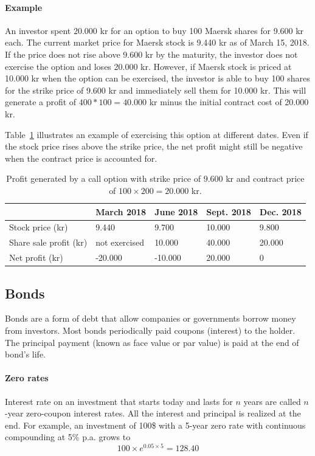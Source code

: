\paragraph{Example}
An investor spent 20.000 kr for an option to buy 100 Maersk shares for 9.600 kr each. The current market price for Maersk stock is 9.440 kr as of March 15, 2018. If the price does not rise above 9.600 kr by the maturity, the investor does not exercise the option and loses 20.000 kr. However, if Maersk stock is priced at 10.000 kr when the option can be exercised, the investor is able to buy 100 shares for the strike price of 9.600 kr and immediately sell them for 10.000 kr. This will generate a profit of $400 * 100 = 40.000$ kr minus the initial contract cost of 20.000 kr.

Table~\ref{table:option-sell} illustrates an example of exercising this option at different dates. Even if the stock price rises above the strike price, the net profit might still be negative when the contract price is accounted for.  

\begin{table}[h]
\centering
\caption{Profit generated by a call option with strike price of 9.600 kr and contract price of $100 \times 200 = 20.000$ kr.}
\label{table:option-sell}
\begin{tabular}{|l|l|l|l|l|}
\hline
                       & March 2018    & June 2018 & Sept. 2018 & Dec. 2018 \\ \hline
Stock price (kr)       & 9.440         & 9.700     & 10.000         & 9.800         \\ \hline
Share sale profit (kr) & not exercised & 10.000    & 40.000         & 20.000        \\ \hline
Net profit (kr)        & -20.000       & -10.000   & 20.000         & 0             \\ \hline
\end{tabular}
\end{table}

\subsection{Bonds}
Bonds are a form of debt that allow companies or governments borrow money from investors. Most bonds periodically paid coupons (interest) to the holder. The principal payment (known as face value or par value) is paid at the end of bond's life.~\cite[pg.80]{ofod}

\paragraph{Zero rates}
Interest rate on an investment that starts today and lasts for $n$ years are called $n$-year zero-coupon interest rates. All the interest and principal is realized at the end. For example, an investment of 100\$ with a 5-year zero rate with continuous compounding at 5\% p.a. grows to~\cite[pg.80]{ofod}
\begin{equation*}
    100 \times e^{0.05 \times 5} = 128.40
\end{equation*}

